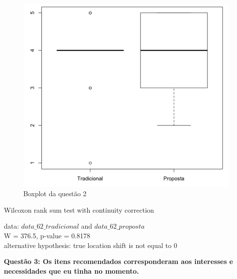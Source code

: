 \begin{figure}[htb]
  \caption{\label{fig:questao2-boxplot}Boxplot da questão 2}
  \begin{center}
      \includegraphics[scale=0.6]{./Figuras/questao2-boxplot.png}
  \end{center}
\end{figure}

Wilcoxon rank sum test with continuity correction

data:  $data\_62\_tradicional$ and $data\_62\_proposta$\\
W = 376.5, p-value = 0.8178\\
alternative hypothesis: true location shift is not equal to 0

\newpage
\textbf{Questão 3: Os itens recomendados corresponderam aos  interesses e necessidades que eu tinha no momento.}

